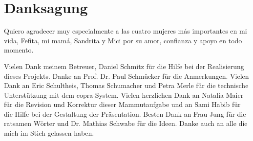 \chapter*{Danksagung}

Quiero agradecer muy especialmente a las cuatro mujeres m\'as importantes en mi vida, Fefita, mi mam\'a, Sandrita y Mici por su amor, confianza y apoyo en todo momento.

Vielen Dank meinem Betreuer, Daniel Schmitz für die Hilfe bei der Realisierung dieses Projekts. Danke an Prof. Dr. Paul Schmücker für die Anmerkungen. Vielen Dank an Eric Schultheis, Thomas Schumacher und Petra Merle für die technische Unterstützung mit dem \acs{copra}-System. Vielen herzlichen Dank an Natalia Maier für die Revision und Korrektur dieser Mammutaufgabe und an Sami Habib für die Hilfe bei der Gestaltung der Präsentation. Besten Dank an Frau Jung für die ratsamen Wörter und Dr. Mathias Schwabe für die Ideen. Danke auch an alle die mich im Stich gelassen haben.
